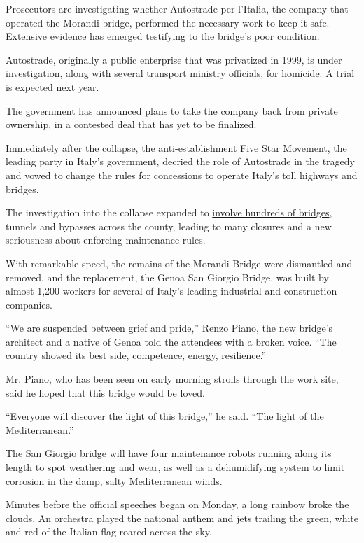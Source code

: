 Prosecutors are investigating whether Autostrade per l'Italia, the
company that operated the Morandi bridge, performed the necessary work
to keep it safe. Extensive evidence has emerged testifying to the
bridge's poor condition.

Autostrade, originally a public enterprise that was privatized in 1999,
is under investigation, along with several transport ministry officials,
for homicide. A trial is expected next year.

The government has announced plans to take the company back from private
ownership, in a contested deal that has yet to be finalized.

Immediately after the collapse, the anti-establishment Five Star
Movement, the leading party in Italy's government, decried the role of
Autostrade in the tragedy and vowed to change the rules for concessions
to operate Italy's toll highways and bridges.

The investigation into the collapse expanded to
\href{https://www.nytimes3xbfgragh.onion/interactive/2018/09/06/world/europe/genoa-italy-bridge.html}{involve
hundreds of bridges}, tunnels and bypasses across the county, leading to
many closures and a new seriousness about enforcing maintenance rules.

With remarkable speed, the remains of the Morandi Bridge were dismantled
and removed, and the replacement, the Genoa San Giorgio Bridge, was
built by almost 1,200 workers for several of Italy's leading industrial
and construction companies.

``We are suspended between grief and pride,'' Renzo Piano, the new
bridge's architect and a native of Genoa told the attendees with a
broken voice. ``The country showed its best side, competence, energy,
resilience.''

Mr. Piano, who has been seen on early morning strolls through the work
site, said he hoped that this bridge would be loved.

``Everyone will discover the light of this bridge,'' he said. ``The
light of the Mediterranean.''

The San Giorgio bridge will have four maintenance robots running along
its length to spot weathering and wear, as well as a dehumidifying
system to limit corrosion in the damp, salty Mediterranean winds.

Minutes before the official speeches began on Monday, a long rainbow
broke the clouds. An orchestra played the national anthem and jets
trailing the green, white and red of the Italian flag roared across the
sky.

